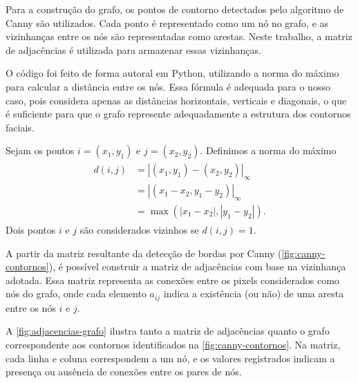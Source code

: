 Para a construção do grafo, os pontos de contorno detectados pelo algoritmo de Canny são utilizados. Cada ponto é representado como um nó no grafo, e as vizinhanças entre os nós são representadas como arestas. Neste trabalho, a matriz de adjacências é utilizada para armazenar essas vizinhanças.

O código foi feito de forma autoral em Python, utilizando a norma do máximo para calcular a distância entre os nós. Essa fórmula é adequada para o nosso caso, pois considera apenas as distâncias horizontais, verticais e diagonais, o que é suficiente para que o grafo represente adequadamente a estrutura dos contornos faciais.

Sejam os pontos \( i = (x_1, y_1) \) e \( j = (x_2, y_2) \). Definimos a norma do máximo
\begin{align}
    \begin{split}
        d(i, j) & =|(x_1,y_1)-(x_2,y_2)|_\infty \\
                & = |(x_1-x_2,y_1-y_2)|_\infty \\
                & = \max(|x_1-x_2|,|y_1-y_2|).
    \end{split}
    \label{eq:distancia-maximo}
\end{align}
Dois pontos $i$ e $j$ são considerados vizinhos se $d(i, j)=1$.

A partir da matriz resultante da detecção de bordas por Canny (\autoref{fig:canny-contornos}), é possível construir a matriz de adjacências com base na vizinhança adotada. Essa matriz representa as conexões entre os pixels considerados como nós do grafo, onde cada elemento \( a_{ij} \) indica a existência (ou não) de uma aresta entre os nós \( i \) e \( j \).

A \autoref{fig:adjacencias-grafo} ilustra tanto a matriz de adjacências quanto o grafo correspondente aos contornos identificados na \autoref{fig:canny-contornos}. Na matriz, cada linha e coluna correspondem a um nó, e os valores registrados indicam a presença ou ausência de conexões entre os pares de nós.


